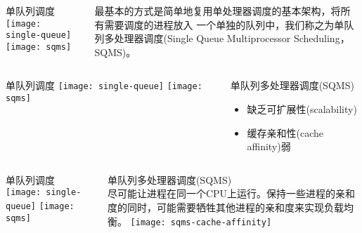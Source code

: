 \begin{frame}
	\begin{columns}
	\begin{column}{.5\textwidth}
	\Large \centering
	单队列调度
    \texttt{[image: single-queue]}
	\texttt{[image: sqms]}	
	\end{column}
	
	\begin{column}{.5\textwidth}
		\large
		最基本的方式是简单地复用单处理器调度的基本架构，将所有需要调度的进程放入 一个单独的队列中，我们称之为单队列多处理器调度(Single Queue Multiprocessor Scheduling，SQMS)。

		
	\end{column}
\end{columns}
\end{frame}
\begin{frame}
	\begin{columns}
		\begin{column}{.5\textwidth}
			\Large \centering
			单队列调度
			\texttt{[image: single-queue]}
			\texttt{[image: sqms]}	
		\end{column}
		
		\begin{column}{.5\textwidth}
			\large
			单队列多处理器调度(SQMS)
			

			\begin{itemize}\large
				\item 缺乏可扩展性(scalability)
				\item 缓存亲和性(cache affinity)弱
			\end{itemize}
			
		\end{column}
	\end{columns}
\end{frame}


\begin{frame}
	\begin{columns}
		\begin{column}{.5\textwidth}
			\Large \centering
			单队列调度
			\texttt{[image: single-queue]}
			\texttt{[image: sqms]}	
		\end{column}
		
		\begin{column}{.5\textwidth}
			\large
			单队列多处理器调度(SQMS) \\
			\normalsize
			尽可能让进程在同一个CPU上运行。保持一些进程的亲和度的同时，可能需要牺牲其他进程的亲和度来实现负载均衡。
			\texttt{[image: sqms-cache-affinity]}

			
		\end{column}
	\end{columns}
\end{frame}

